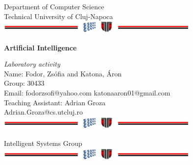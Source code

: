 \documentclass[a4paper,12pt]{report}
\begin{document}
\vspace{-5cm}
\begin{center}
Department of Computer Science\\
Technical University of Cluj-Napoca\\
\includegraphics[width=10cm]{fig/footer}
\end{center}
\vspace{1cm}
\begin{center}
\begin{Large}
 \textbf{Artificial Intelligence}\\
\end{Large}
\textit{Laboratory activity}\\
\vspace{3cm}
Name: Fodor, Zsófia and Katona, Áron\\
Group: 30433\\
Email: fodorzsofi@yahoo.com katonaaron01@gmail.com\\
\vspace{12cm}
Teaching Assistant: Adrian Groza\\
Adrian.Groza@cs.utcluj.ro\\
\vspace{1cm}
\includegraphics[width=10cm]{fig/footer}
\end{center}

\tableofcontents









\appendix





\vspace{2cm}
\begin{center}
Intelligent Systems Group\\
\includegraphics[width=10cm]{fig/footer}
\end{center}
\end{document}
